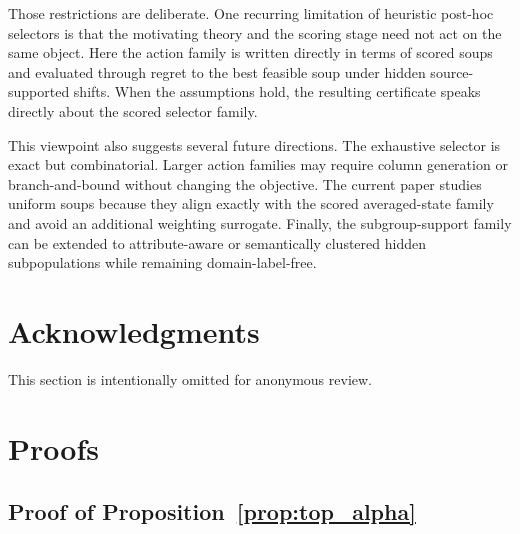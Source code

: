 \documentclass{article}
\newcommand{\1}{\mathbbm{1}}
\begin{document}
Those restrictions are deliberate. One recurring limitation of heuristic post-hoc selectors is that the motivating theory and the scoring stage need not act on the same object. Here the action family is written directly in terms of scored soups and evaluated through regret to the best feasible soup under hidden source-supported shifts. When the assumptions hold, the resulting certificate speaks directly about the scored selector family.

This viewpoint also suggests several future directions. The exhaustive selector is exact but combinatorial. Larger action families may require column generation or branch-and-bound without changing the objective. The current paper studies uniform soups because they align exactly with the scored averaged-state family and avoid an additional weighting surrogate. Finally, the subgroup-support family can be extended to attribute-aware or semantically clustered hidden subpopulations while remaining domain-label-free.

\section*{Acknowledgments}

This section is intentionally omitted for anonymous review.




\appendix

\section{Proofs}

\subsection{Proof of Proposition~\ref{prop:top_alpha}}
\end{document}
